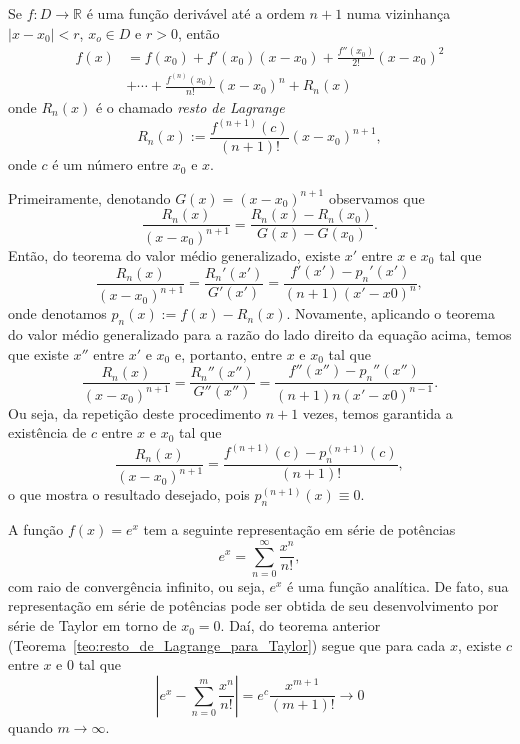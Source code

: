 \begin{teo}\label{teo:resto_de_Lagrange_para_Taylor}
  Se $f:D\to\mathbb{R}$ é uma função derivável até a ordem $n+1$ numa vizinhança $|x-x_0|<r$, $x_o\in D$ e $r>0$, então
  \begin{align}
    f(x) &= f(x_0) + f'(x_0)(x-x_0) + \frac{f''(x_0)}{2!}(x-x_0)^2 \\
    &+ \cdots + \frac{f^{(n)}(x_0)}{n!}(x-x_0)^n + R_n(x)  \end{align} 
onde $R_n(x)$ é o chamado \emph{resto de Lagrange}
\begin{equation}
  R_n(x) := \frac{f^{(n+1)}(c)}{(n+1)!}(x-x_0)^{n+1},
\end{equation}
onde $c$ é um número entre $x_0$ e $x$.
\end{teo}
\begin{dem}
  Primeiramente, denotando $G(x) = (x-x_0)^{n+1}$ observamos que
  \begin{equation}
    \frac{R_n(x)}{(x-x_0)^{n+1}} = \frac{R_n(x)-R_n(x_0)}{G(x) - G(x_0)}.
  \end{equation}
Então, do teorema do valor médio generalizado, existe $x'$ entre $x$ e $x_0$ tal que
\begin{equation}
  \frac{R_n(x)}{(x-x_0)^{n+1}} = \frac{R_n'(x')}{G'(x')} = \frac{f'(x') - p_n'(x')}{(n+1)(x'-x0)^n},
\end{equation}
onde denotamos $p_n(x) := f(x) - R_n(x)$. Novamente, aplicando o teorema do valor médio generalizado para a razão do lado direito da equação acima, temos que existe $x''$ entre $x'$ e $x_0$ e, portanto, entre $x$ e $x_0$ tal que
\begin{equation}
  \frac{R_n(x)}{(x-x_0)^{n+1}} = \frac{R_n''(x'')}{G''(x'')} = \frac{f''(x'') - p_n''(x'')}{(n+1)n(x'-x0)^{n-1}}.
\end{equation}
Ou seja, da repetição deste procedimento $n+1$ vezes, temos garantida a existência de $c$ entre $x$ e $x_0$ tal que
\begin{equation}
  \frac{R_n(x)}{(x-x_0)^{n+1}} = \frac{f^{(n+1)}(c) - p_n^{(n+1)}(c)}{(n+1)!},
\end{equation}
o que mostra o resultado desejado, pois $p_n^{(n+1)}(x)\equiv 0$.
\end{dem}

\begin{ex}
  A função $f(x) = e^x$ tem a seguinte representação em série de potências
  \begin{equation}
    e^x = \sum_{n=0}^\infty \frac{x^n}{n!},
  \end{equation}
com raio de convergência infinito, ou seja, $e^x$ é uma função analítica. De fato, sua representação em série de potências pode ser obtida de seu desenvolvimento por série de Taylor em torno de $x_0 = 0$. Daí, do teorema anterior (Teorema~\ref{teo:resto_de_Lagrange_para_Taylor}) segue que para cada $x$, existe $c$ entre $x$ e $0$ tal que
\begin{equation}
  |e^x - \sum_{n=0}^m \frac{x^n}{n!}| = e^c\frac{x^{m+1}}{(m+1)!}\to 0
\end{equation}
quando $m\to \infty$.
\end{ex}

